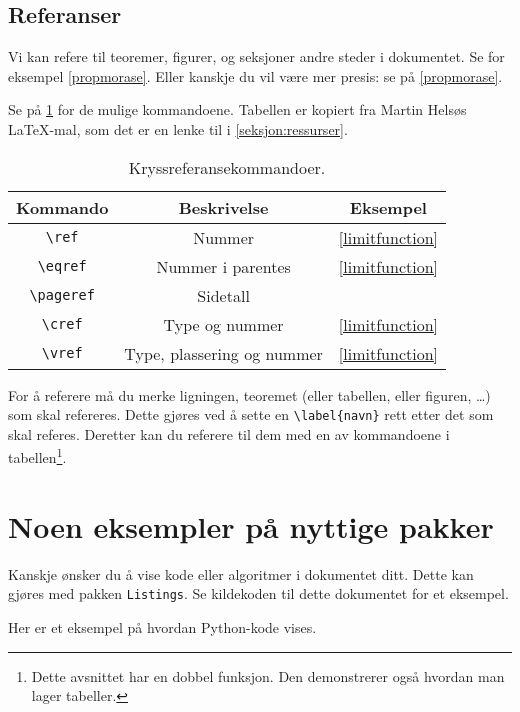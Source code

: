 \documentclass[a4paper, norsk]{article}  %
\begin{document}
\subsection{Referanser}

Vi kan refere til teoremer, figurer, og seksjoner andre steder i dokumentet. Se for eksempel \cref{propmorase}. Eller kanskje du vil være mer presis: se på \vref{propmorase}.

Se på \cref{tab:kryssreferanser} for de mulige kommandoene. Tabellen er kopiert fra Martin Helsøs \LaTeX-mal, som det er en lenke til i \vref{seksjon:ressurser}.

\begin{table}
\centering
\begin{tabular}{c|c|c}
\hline
    Kommando & Beskrivelse & Eksempel \\
\hline
    \texttt{\textbackslash ref}     & Nummer            & \ref{limitfunction}        \\
    \texttt{\textbackslash eqref}   & Nummer i parentes & \eqref{limitfunction}      \\
    \texttt{\textbackslash pageref} & Sidetall          & \pageref{limitfunction}    \\
    \texttt{\textbackslash cref}    & Type og nummer    & \cref{limitfunction}       \\
    \texttt{\textbackslash vref} & Type, plassering og nummer & \vref{limitfunction} \\
\end{tabular}
\caption{Kryssreferansekommandoer.}
\label{tab:kryssreferanser}
\end{table}

For å referere må du merke ligningen, teoremet (eller tabellen, eller figuren, \dots) som skal refereres. Dette gjøres ved å sette en \verb|\label{navn}| rett etter det som skal referes. Deretter kan du referere til dem med en av kommandoene i tabellen\footnote{Dette avsnittet har en dobbel funksjon. Den demonstrerer også hvordan man lager tabeller.}.

\section{Noen eksempler på nyttige pakker}
\label{seksjonpakker}

Kanskje ønsker du å vise kode eller algoritmer i dokumentet ditt. Dette kan gjøres med pakken \texttt{Listings}. Se kildekoden til dette dokumentet for et eksempel. 

Her er et eksempel på hvordan Python-kode vises.
\end{document}
